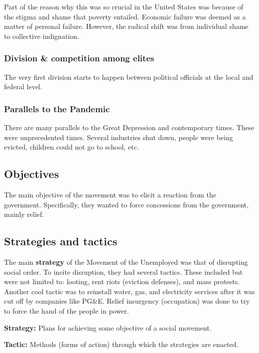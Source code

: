 Part of the reason why this was so crucial in the United States was because of the stigma and shame that poverty entailed.
Economic failure was deemed as a matter of personal failure.
However, the radical shift was from individual shame to collective indignation.

\subsubsection{Division \& competition among elites}
The very first division starts to happen between political officials at the local and federal level.

\subsubsection{Parallels to the Pandemic}
There are many parallels to the Great Depression and contemporary times.
These were unprecedented times.
Several industries shut down, people were being evicted, children could not go to school, etc.

\subsection{Objectives}
The main objective of the movement was to elicit a reaction from the government.
Specifically, they wanted to force concessions from the government, mainly relief.

\subsection{Strategies and tactics}
The main \textbf{strategy} of the Movement of the Unemployed was that of disrupting social order.
To incite disruption, they had several tactics.
These included but were not limited to: looting, rent riots (eviction defenses), and mass protests.
Another cool tactic was to reinstall water, gas, and electricity services after it was cut off by companies like PG\&E.
Relief insurgency (occupation) was done to try to force the hand of the people in power.

\noindent \textbf{Strategy:} Plans for achieving some objective of a social movement. 

\noindent \textbf{Tactic:} Methods (forms of action) through which the strategies are enacted.


